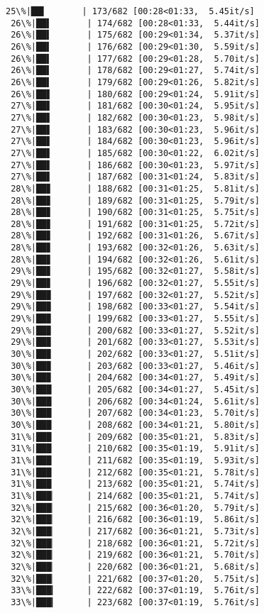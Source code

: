 \documentclass[11pt]{article}
\begin{document}
\begin{Verbatim}[commandchars=\\\{\}]
 25\%|██▌       | 173/682 [00:28<01:33,  5.45it/s]
 26\%|██▌       | 174/682 [00:28<01:33,  5.44it/s]
 26\%|██▌       | 175/682 [00:29<01:34,  5.37it/s]
 26\%|██▌       | 176/682 [00:29<01:30,  5.59it/s]
 26\%|██▌       | 177/682 [00:29<01:28,  5.70it/s]
 26\%|██▌       | 178/682 [00:29<01:27,  5.74it/s]
 26\%|██▌       | 179/682 [00:29<01:26,  5.82it/s]
 26\%|██▋       | 180/682 [00:29<01:24,  5.91it/s]
 27\%|██▋       | 181/682 [00:30<01:24,  5.95it/s]
 27\%|██▋       | 182/682 [00:30<01:23,  5.98it/s]
 27\%|██▋       | 183/682 [00:30<01:23,  5.96it/s]
 27\%|██▋       | 184/682 [00:30<01:23,  5.96it/s]
 27\%|██▋       | 185/682 [00:30<01:22,  6.02it/s]
 27\%|██▋       | 186/682 [00:30<01:23,  5.97it/s]
 27\%|██▋       | 187/682 [00:31<01:24,  5.83it/s]
 28\%|██▊       | 188/682 [00:31<01:25,  5.81it/s]
 28\%|██▊       | 189/682 [00:31<01:25,  5.79it/s]
 28\%|██▊       | 190/682 [00:31<01:25,  5.75it/s]
 28\%|██▊       | 191/682 [00:31<01:25,  5.72it/s]
 28\%|██▊       | 192/682 [00:31<01:26,  5.67it/s]
 28\%|██▊       | 193/682 [00:32<01:26,  5.63it/s]
 28\%|██▊       | 194/682 [00:32<01:26,  5.61it/s]
 29\%|██▊       | 195/682 [00:32<01:27,  5.58it/s]
 29\%|██▊       | 196/682 [00:32<01:27,  5.55it/s]
 29\%|██▉       | 197/682 [00:32<01:27,  5.52it/s]
 29\%|██▉       | 198/682 [00:33<01:27,  5.54it/s]
 29\%|██▉       | 199/682 [00:33<01:27,  5.55it/s]
 29\%|██▉       | 200/682 [00:33<01:27,  5.52it/s]
 29\%|██▉       | 201/682 [00:33<01:27,  5.53it/s]
 30\%|██▉       | 202/682 [00:33<01:27,  5.51it/s]
 30\%|██▉       | 203/682 [00:33<01:27,  5.46it/s]
 30\%|██▉       | 204/682 [00:34<01:27,  5.49it/s]
 30\%|███       | 205/682 [00:34<01:27,  5.45it/s]
 30\%|███       | 206/682 [00:34<01:24,  5.61it/s]
 30\%|███       | 207/682 [00:34<01:23,  5.70it/s]
 30\%|███       | 208/682 [00:34<01:21,  5.80it/s]
 31\%|███       | 209/682 [00:35<01:21,  5.83it/s]
 31\%|███       | 210/682 [00:35<01:19,  5.91it/s]
 31\%|███       | 211/682 [00:35<01:19,  5.93it/s]
 31\%|███       | 212/682 [00:35<01:21,  5.78it/s]
 31\%|███       | 213/682 [00:35<01:21,  5.74it/s]
 31\%|███▏      | 214/682 [00:35<01:21,  5.74it/s]
 32\%|███▏      | 215/682 [00:36<01:20,  5.79it/s]
 32\%|███▏      | 216/682 [00:36<01:19,  5.86it/s]
 32\%|███▏      | 217/682 [00:36<01:21,  5.73it/s]
 32\%|███▏      | 218/682 [00:36<01:21,  5.72it/s]
 32\%|███▏      | 219/682 [00:36<01:21,  5.70it/s]
 32\%|███▏      | 220/682 [00:36<01:21,  5.68it/s]
 32\%|███▏      | 221/682 [00:37<01:20,  5.75it/s]
 33\%|███▎      | 222/682 [00:37<01:19,  5.76it/s]
 33\%|███▎      | 223/682 [00:37<01:19,  5.76it/s]

\end{Verbatim}
\end{document}
